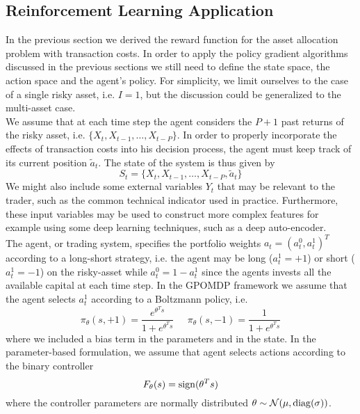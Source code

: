 \subsection{Reinforcement Learning Application}
In the previous section we derived the reward function for the asset allocation problem with transaction costs. In order to apply the policy gradient algorithms discussed in the previous sections we still need to define the state space, the action space and the agent's policy. For simplicity, we limit ourselves to the case of a single risky asset, i.e. $I = 1$, but the discussion could be generalized to the multi-asset case.\\
We assume that at each time step the agent considers the $P+1$ past returns of the risky asset, i.e. $\{X_t, X_{t-1}, \ldots, X_{t-P}\}$. In order to properly incorporate the effects of transaction costs into his decision process, the agent must keep track of its current position $\tilde{a}_t$. The state of the system is thus given by 
\begin{equation}
	S_t = \{X_t, X_{t-1}, \ldots, X_{t-P}, \tilde{a}_t\}
\end{equation}
We might also include some external variables $Y_t$ that may be relevant to the trader, such as the common technical indicator used in practice. Furthermore, these input variables may be used to construct more complex features for example using some deep learning techniques, such as a deep auto-encoder.\\
The agent, or trading system, specifies the portfolio weights $a_t = (a_t^0, a_t^1)^T$ according to a long-short strategy, i.e. the agent may be long ($a_t^1 = +1$) or short ($a_t^1 = -1$) on the risky-asset while $a_t^0 = 1 - a_t^1$ since the agents invests all the available capital at each time step. In the GPOMDP framework we assume that the agent selects $a_t^1$ according to a Boltzmann policy, i.e.
\begin{equation}
	\pi_\theta(s, +1) = \frac{e^{\theta^T s}}{1 + e^{\theta^T s}} \;\;\;\;\; \pi_\theta(s, -1) = \frac{1}{1 + e^{\theta^T s}}
\end{equation}
where we included a bias term in the parameters and in the state. In the parameter-based formulation, we assume that agent selects actions according to the binary controller
\begin{equation}
	F_\theta(s) = \operatorname{sign}(\theta^T s)
\end{equation}
where the controller parameters are normally distributed $\theta \sim \mathcal{N}(\mu, \operatorname{diag}(\sigma))$. 
